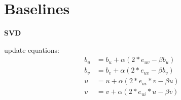 \documentclass[11pt]{article}
\begin{document}




\section{Baselines}

\textbf{SVD}

update equations:
\begin{align*}
b_u &= b_u+\alpha(2*e_{uv}-\beta b_u) \\
b_v &= b_v+\alpha(2*e_{uv}-\beta b_v) \\
u &= u+\alpha(2*e_{ui}*v-\beta u) \\
v &= v+\alpha(2*e_{ui}*u-\beta v)
\end{align*}
\end{document}
